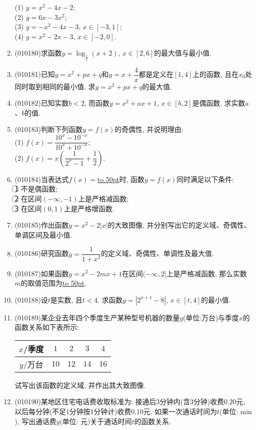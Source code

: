 \documentclass[10pt,a4paper]{article}
\newcommand{\blank}[1]{\underline{\hbox to #1pt{}}}
\begin{document}
\begin{enumerate}[1.]
(1) $y=x^2-4x-2$;\\
(2) $y=6x-3x^2$;\\
(3) $y=-x^2-4x-3$, $x\in [-3, 1]$;\\
(4) $y=x^2-2x-3$, $x\in [-2, 0]$.
\item {\tiny (010180)}求函数$y=\log_{\frac 12}(x+2)$, $x\in [2, 6]$的最大值与最小值.
\item {\tiny (010181)}已知$y=x^2+px+q$和$y=x+\dfrac 4x$都是定义在$[1, 4]$上的函数, 且在$x_0$处同时取到相同的最小值. 求$y=x^2+px+q$的最大值.
\item {\tiny (010182)}已知实数$b<2$, 而函数$y=x^2+ax+1$, $x\in [b, 2]$是偶函数. 求实数$a$、$b$的值.
\item {\tiny (010183)}判断下列函数$y=f(x)$的奇偶性, 并说明理由:\\
(1) $f(x)=\dfrac{10^x-10^{-x}}{10^x+10^{-x}}$;\\
(2) $f(x)=x(\dfrac 1{2^x-1}+\dfrac 12)$.
\item {\tiny (010184)}当表达式$f(x)=$\blank{50}时, 函数$y=f(x)$同时满足以下条件:\\
\textcircled{1} 不是偶函数;\\
\textcircled{2} 在区间$(-\infty, -1)$上是严格减函数;\\
\textcircled{3} 在区间$(0, 1)$上是严格增函数.
\item {\tiny (010185)}作出函数$y=x^2-2|x|$的大致图像, 并分别写出它的定义域、奇偶性、单调区间及最小值.
\item {\tiny (010186)}研究函数$y=\dfrac1{1+x^2}$的定义域、奇偶性、单调性及最大值.
\item {\tiny (010187)}如果函数$y=x^2-2mx+1$在区间$(-\infty, 2]$上是严格减函数, 那么实数$m$的取值范围为\blank{50}.
\item {\tiny (010188)}设$t$是实数, 且$t<4$. 求函数$y=|2^{x+1}-8|$, $x\in [t, 4]$的最小值.
\item {\tiny (010189)}某企业去年四个季度生产某种型号机器的数量$y$(单位:万台)与季度$x$的函数关系如下表所示:
\begin{center}
\begin{tabular}{|c|c|c|c|c|}
\hline
$x$/季度 & $1$ & $2$ & $3$ & $4$ \\ \hline
$y$/万台 & $10$ & $12$ & $14$ & $16$ \\ \hline
\end{tabular}
\end{center}
试写出该函数的定义域, 并作出其大致图像.
\item {\tiny (010190)}某地区住宅电话费收取标准为: 接通后$3$分钟内(含$3$分钟)收费$0.20$元, 以后每分钟(不足$1$分钟按$1$分钟计)收费$0.10$元. 如果一次通话时间为$t$(单位: $\text{min}$), 写出通话费$y$(单位: 元)关于通话时间$t$的函数关系.

\end{enumerate}
\end{document}
